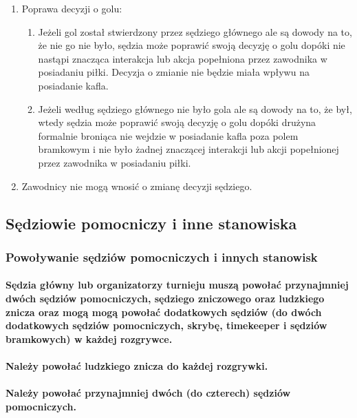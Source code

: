 \documentclass[12pt]{article}
\begin{document}
\begin{enumerate}
\item
    Poprawa decyzji o golu:
  
  \begin{enumerate}
  \item
        Jeżeli gol został stwierdzony przez sędziego głównego ale są dowody
    na to, że nie go nie było, sędzia może poprawić swoją decyzję o golu
    dopóki nie nastąpi znacząca interakcja lub akcja popełniona przez
    zawodnika w posiadaniu piłki. Decyzja o zmianie nie będzie miała
    wpływu na posiadanie kafla.
      \item
        Jeżeli według sędziego głównego nie było gola ale są dowody na to,
    że był, wtedy sędzia może poprawić swoją decyzję o golu dopóki
    drużyna formalnie broniąca nie wejdzie w posiadanie kafla poza polem
    bramkowym i nie było żadnej znaczącej interakcji lub akcji
    popełnionej przez zawodnika w posiadaniu piłki.
      \end{enumerate}
\item
    Zawodnicy nie mogą wnosić o zmianę decyzji sędziego.
  \end{enumerate}

\subsection{Sędziowie pomocniczy i inne stanowiska}

\subsubsection{Powoływanie sędziów pomocniczych i innych stanowisk}

\paragraph{Sędzia główny lub organizatorzy turnieju muszą powołać
przynajmniej dwóch sędziów pomocniczych, sędziego zniczowego oraz
ludzkiego znicza oraz mogą mogą powołać dodatkowych sędziów (do dwóch
dodatkowych sędziów pomocniczych, skrybę, timekeeper i sędziów
bramkowych) w każdej rozgrywce.}

\paragraph{Należy powołać ludzkiego znicza do każdej rozgrywki.}

\paragraph{Należy powołać przynajmniej dwóch (do czterech)
sędziów pomocniczych.}
\end{document}
